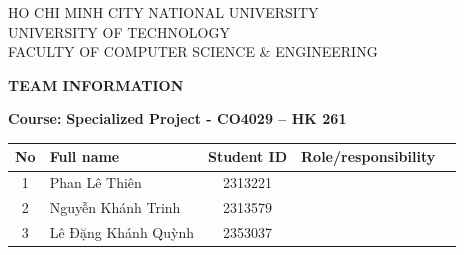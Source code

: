 {\RaggedRight
HO CHI MINH CITY NATIONAL UNIVERSITY \\
UNIVERSITY OF TECHNOLOGY \\
FACULTY OF COMPUTER SCIENCE \& ENGINEERING
}

\begin{center}

\textbf{\large TEAM INFORMATION}

\vspace{0.3em}

\textbf{Course: } \textbf{Specialized Project
 - CO4029 -- HK 261}

\vspace{0.3em}

\begin{tabularx}{\textwidth}{|c|X|c|X|X|}
    \hline
    \textbf{No} & \textbf{Full name} & \textbf{Student ID} & \textbf{Role/responsibility} \\ 
    \hline
    1 & Phan Lê Thiên  & 2313221    &  \\
    \hline
    2 & Nguyễn Khánh Trinh & 2313579   &  \\
    \hline
    3 & Lê Đặng Khánh Quỳnh & 2353037   &  \\
    \hline
\end{tabularx}


\end{center}